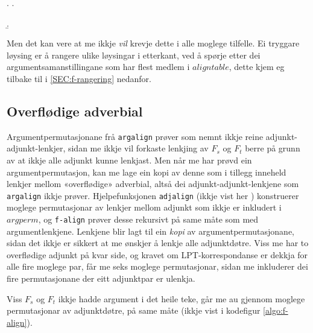 \documentclass[11pt,a4paper,oneside,draft]{book}
\begin{document}
{\avmoptions{}

\ex. \a.  \begin{avm}    \end{avm}
  \b.\begin{avm}  \end{avm}

}

Men det kan vere at me ikkje \emph{vil} krevje dette i alle moglege
tilfelle. Ei tryggare løysing er å rangere ulike løysingar i
etterkant, ved å spørje etter dei argumentsamanstillingane som har
flest medlem i $aligntable$, dette kjem eg tilbake til i
\ref{SEC:f-rangering} nedanfor.
\subsection{Overflødige adverbial}
\label{sec-4.1.1}

   \label{SEC:impl-adjalign}

Argumentpermutasjonane frå \texttt{argalign} prøver som nemnt ikkje reine
adjunkt-adjunkt-lenkjer, sidan me ikkje vil forkaste lenkjing av $F_s$
og $F_t$ berre på grunn av at ikkje alle adjunkt kunne lenkjast. Men
når me har prøvd ein argumentpermutasjon, kan me lage ein kopi av
denne som i tillegg inneheld lenkjer mellom «overflødige» adverbial,
altså dei adjunkt-adjunkt-lenkjene som \texttt{argalign} ikkje
prøver. Hjelpefunksjonen \texttt{adjalign} (ikkje vist her
) konstruerer moglege
permutasjonar av lenkjer mellom adjunkt som ikkje er inkludert i
$argperm$, og \texttt{f-align} prøver desse rekursivt på same måte som med
argumentlenkjene.  Lenkjene blir lagt til ein
\emph{kopi} av argumentpermutasjonane, sidan det ikkje er sikkert at me
ønskjer å lenkje alle adjunktdøtre. Viss me har to overflødige adjunkt
på kvar side, og kravet om LPT-korrespondanse er dekkja for alle fire
moglege par, får me seks moglege permutasjonar, sidan me inkluderer
dei fire permutasjonane der eitt adjunktpar er ulenkja.

Viss $F_s$ og $F_t$ ikkje hadde argument i det heile teke, går me au
gjennom moglege permutasjonar av adjunktdøtre, på same måte (ikkje
vist i kodefigur \ref{algo:f-align}).
\end{document}
